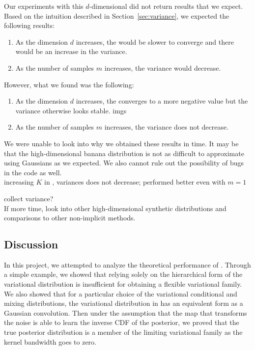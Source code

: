 \documentclass[10pt]{article}
\begin{document}
Our experiments with this $d$-dimensional did not return results that we expect. Based on the intuition described in Section~\ref{sec:variance}, we expected the following results:
\begin{enumerate}
\item
As the dimension $d$ increases, the \elbo would be slower to converge and there would be an increase in the variance.
\item
As the number of \mcmc samples $m$ increases, the \elbo variance would decrease.
\end{enumerate}
However, what we found was the following:
\begin{enumerate}
\item
As the dimension $d$ increases, the \elbo converges to a more negative value but the variance otherwise looks stable. \todo imgs
\item
As the number of \mcmc samples $m$ increases, the \elbo variance does not decrease.
\end{enumerate}
We were unable to look into why we obtained these results in time. It may be that the high-dimensional banana distribution is not as difficult to approximate using Gaussians as we expected. We also cannot rule out the possibility of bugs in the code as well. \todo
\\

increasing $K$ in \sivi, variances does not decrease; \uivi performed better even with $m=1$

\todo collect variance?
\\

If more time, look into other high-dimensional synthetic distributions and comparisons to other non-implicit \vi methods.


\subsection{Discussion} \label{sec:discussion}

In this project, we attempted to analyze the theoretical performance of \uivi. Through a simple example, we showed that relying solely on the hierarchical form of the variational distribution is insufficient for obtaining a flexible variational family. We also showed that for a particular choice of the variational conditional and mixing distributions, the variational distribution in \uivi has an equivalent form as a Gaussian convolution. Then under the assumption that the map that transforms the noise is able to learn the inverse CDF of the posterior, we proved that the true posterior distribution is a member of the limiting variational family as the kernel bandwidth goes to zero.
\\
\end{document}
